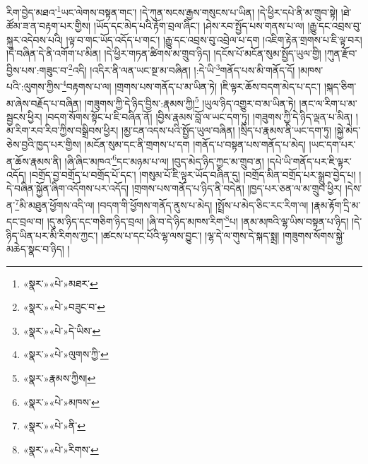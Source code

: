 རིག་བྱེད་མཐའ་\footnote{«སྣར་»«པེ་»མཐར་}ཡང་ལེགས་བསྟན་གང་། །དེ་ཀུན་སངས་རྒྱས་གསུངས་པ་ཡིན། །དེ་ཕྱིར་དཔེ་ནི་མ་གྲུབ་སྟེ། །ཐེ་ཚོམ་ཟ་ན་བརྟག་པར་གྱིས། །ཡོད་དང་མེད་པའི་རྟོག་བྲལ་ཞིང་། །ཤེས་རབ་སྤྱོད་པས་གནས་པ་ལ། །རྒྱུ་དང་འབྲས་བུ་སྐུར་འདེབས་པའི། །ལྟ་བ་གང་ཡོད་འདོད་པ་གང་། །རྒྱུ་དང་འབྲས་བུ་འབྲེལ་པ་དག །འཇིག་རྟེན་གྲགས་པ་ཇི་ལྟ་བར། །དེ་བཞིན་དེ་ནི་འགོག་པ་མིན། །དེ་ཕྱིར་གཏན་ཚིགས་མ་གྲུབ་ཉིད། །དངོས་པོ་མངོན་སུམ་སྤྱོད་ཡུལ་གྱི། །ཀུན་རྫོབ་བྱིས་པས་:གཟུང་བ་\footnote{«སྣར་»«པེ་»བཟུང་བ་}འདི། །འདིར་ནི་ལན་ཡང་སྔ་མ་བཞིན། །:དེ་ཡི་\footnote{«སྣར་»«པེ་»དེ་ཡིས་}གནོད་པས་མི་གནོད་དོ། །མཁས་པའི་:ལུགས་ཀྱིས་\footnote{«སྣར་»«པེ་»ལུགས་ཀྱི་}བརྟགས་པ་ལ། །གྲགས་པས་གནོད་པ་མ་ཡིན་ཏེ། །ཇི་ལྟར་ཆོས་བདག་མེད་པ་དང་། །སྐད་ཅིག་མ་ཞེས་བརྗོད་པ་བཞིན། །གཟུགས་ཀྱི་དེ་ཉིད་བྱིས་:རྣམས་ཀྱི།\footnote{«སྣར་»རྣམས་ཀྱིས།} །ཡུལ་ཉིད་འགྱུར་བ་མ་ཡིན་ཏེ། །ནང་ལ་རིག་པ་མ་སྦྱངས་ཕྱིར། །བདག་སོགས་སྟོང་པ་ཇི་བཞིན་ནོ། །བྱིས་རྣམས་བློ་ལ་ཡང་དག་ཏུ། །གཟུགས་ཀྱི་དེ་ཉིད་ལྡན་པ་མིན། །མ་རིག་རབ་རིབ་ཀྱིས་བསྒྲིབས་ཕྱིར། །མྱ་ངན་འདས་པའི་སྤྱོད་ཡུལ་བཞིན། །སྲིད་པ་རྣམས་ནི་ཡང་དག་ཏུ། །སྐྱེ་མེད་ཅེས་བྱའི་ཁྱད་པར་གྱིས། །མངོན་སུམ་དང་ནི་གྲགས་པ་དག །གནོད་པ་བསྟན་པས་གནོད་པ་མེད། །ཡང་དག་པར་ན་ཆོས་རྣམས་ནི། །ཞི་ཞིང་མཁའ་\footnote{«སྣར་»«པེ་»མཁས་}དང་མཉམ་པ་ལ། །བུད་མེད་ཉིད་ཀྱང་མ་གྲུབ་ན། །དཔེ་ཡི་གནོད་པར་ཇི་ལྟར་འདོད། །བགྲོད་བྱ་བགྲོད་པ་བགྲོད་པོ་དང་། །གསུམ་པོ་ཇི་ལྟར་ཡོད་བཞིན་དུ། །བགྲོད་མིན་བགྲོད་པར་སྒྲུབ་བྱེད་པ། །དེ་བཞིན་སྐྱོན་ཞིག་འདོགས་པར་འདོད། །གྲགས་པས་གནོད་པ་ཉིད་ནི་བདེན། །ཁྱད་པར་ཅན་ལ་མ་གྲུབ་ཕྱིར། །དེས་ན་\footnote{«སྣར་»«པེ་»ནི་}མི་མཐུན་ཕྱོགས་འདི་ལ། །བདག་གི་ཕྱོགས་གནོད་ནུས་པ་མེད། །སྤྲོས་པ་མེད་ཅིང་རང་རིག་ལ། །རྣམ་རྟོག་དྲི་མ་དང་བྲལ་བ། །དུ་མ་ཉིད་དང་གཅིག་ཉིད་བྲལ། །ཞི་བ་དེ་ཉིད་མཁས་རིག་\footnote{«སྣར་»«པེ་»རིགས་}པ། །ནམ་མཁའི་ལྷ་ཡིས་བསྟན་པ་ཉིད། །དེ་ཉིད་ཡིན་པར་མི་རིགས་ཀྱང་། །ཚངས་པ་དང་པོའི་ལྷ་ལས་བྱུང་། །ལྷ་དེ་ལ་གུས་དེ་སྐད་སྨྲ། །གཟུགས་སོགས་སྐྱེ་མཆེད་སྣང་བ་ཉིད། །
